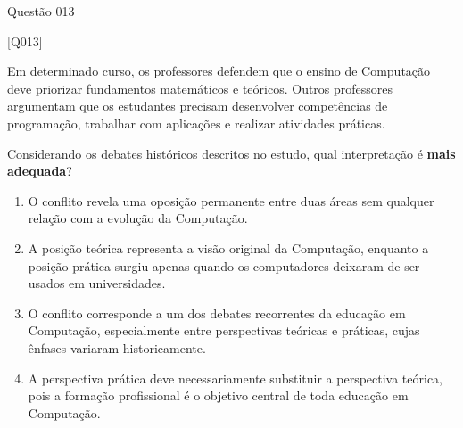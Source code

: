 \documentclass[xcolor=dvipsnames,table]{beamer}
\begin{document}
{\logo{}
\begin{frame}{Questão 013}

    \footnotesize

    \begin{block}{[Q013]}

    Em determinado curso, os professores defendem que o ensino de Computação deve priorizar fundamentos matemáticos e teóricos. Outros professores argumentam que os estudantes precisam desenvolver competências de programação, trabalhar com aplicações e realizar atividades práticas.

    Considerando os debates históricos descritos no estudo, qual interpretação é \textbf{mais adequada}?

    \end{block}

    \begin{enumerate}[label=(\Alph*)]

        \item O conflito revela uma oposição permanente entre duas áreas sem qualquer relação com a evolução da Computação.

        \item A posição teórica representa a visão original da Computação, enquanto a posição prática surgiu apenas quando os computadores deixaram de ser usados em universidades.

        \item O conflito corresponde a um dos debates recorrentes da educação em Computação, especialmente entre perspectivas teóricas e práticas, cujas ênfases variaram historicamente.

        \item A perspectiva prática deve necessariamente substituir a perspectiva teórica, pois a formação profissional é o objetivo central de toda educação em Computação.

    \end{enumerate}

\end{frame}
}
\end{document}
